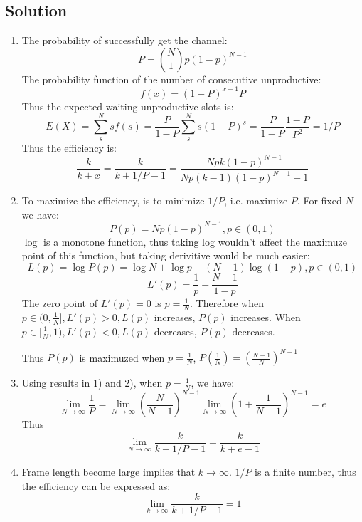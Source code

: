 \subsection*{Solution}

\begin{enumerate}
      \item The probability of successfully get the channel:
            $$P = {N \choose 1}p(1-p)^{N-1}$$
            The probability function of the number of consecutive unproductive:
            $$f(x) = (1-P)^{x-1}P$$
            Thus the expected waiting unproductive slots is:
            $$E(X) = \sum_s^N sf(s) = \frac{P}{1-P}\sum_s^N s(1-P)^s = \frac{P}{1-P}\frac{1-P}{P^2} = 1/P $$
            Thus the efficiency is:
            $$ \frac{k}{k+x} = \frac{k}{k+1/P-1} = \frac{Npk(1-p)^{N-1}}{Np(k-1)(1-p)^{N-1} + 1}$$

      \item To maximize the efficiency, is to minimize $1/P$, i.e. maximize $P$.
            For fixed $N$ we have: $$P(p) = Np(1-p)^{N-1}, p \in (0, 1)$$
            $\log$ is a monotone function, thus taking log wouldn't affect the maximuze point of this function, but taking derivitive would be much easier:
            $$L(p) = \log P(p) = \log N + \log p + (N-1)\log (1-p), p \in (0, 1)$$
            $$L'(p) = \frac{1}{p} - \frac{N-1}{1-p}$$
            The zero point of $L'(p) = 0$ is $p = \frac{1}{N}$.
            Therefore when $p \in (0, \frac{1}{N}], L'(p) > 0, L(p)$ increases, $P(p)$ increases.
            When $p \in [\frac{1}{N}, 1), L'(p) < 0, L(p)$ decreases, $P(p)$ decreases.

            Thus $P(p)$ is maximuzed when $p = \frac{1}{N}$, $P(\frac{1}{N}) = (\frac{N-1}{N})^{N-1}$

      \item Using results in 1) and 2), when $p = \frac{1}{N}$, we have:
            $$\lim_{N \rightarrow \infty} \frac{1}{P} = \lim_{N \rightarrow \infty} (\frac{N}{N-1})^{N-1} \lim_{N \rightarrow \infty} (1 + \frac{1}{N-1})^{N-1}= e$$
            Thus $$\lim_{N \rightarrow \infty} \frac{k}{k + 1/P-1} = \frac{k}{k+e-1}$$

      \item Frame length become large implies that $k \rightarrow \infty$.
            $1/P$ is a finite number, thus the efficiency can be expressed as:
            $$ \lim_{k \rightarrow \infty} \frac{k}{k + 1/P - 1} = 1$$
\end{enumerate}
